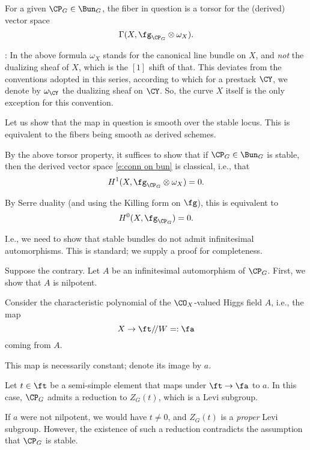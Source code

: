 \documentclass[9pt]{amsart}
\theoremstyle{remark}
\theoremstyle{definition}
\theoremstyle{remark}
\numberwithin{equation}{section}
\begin{document}
\medskip

For a given $\CP_G\in \Bun_G$, the fiber in question is a torsor for the (derived) vector space
\begin{equation} \label{e:conn on bun}
\Gamma(X,\fg_{\CP_G}\otimes \omega_X).
\end{equation} 

: In the above formula $\omega_X$ stands for the canonical line bundle on $X$, and \emph{not} 
the dualizing sheaf of $X$, which is the $[1]$ shift of that. This deviates from the conventions adopted
in this series, according to which for a prestack $\CY$, we denote by $\omega_\CY$ the dualizing
sheaf on $\CY$. So, the curve $X$ itself is the only exception for this convention.  

\sssec{}

Let us show that the map in question is smooth over the stable locus. This is equivalent to the fibers
being smooth as derived schemes. 

\medskip

By the above torsor property, it suffices to show that if $\CP_G\in \Bun_G$ is stable, then the derived vector
space \eqref{e:conn on bun} is classical, i.e., that
$$H^1(X,\fg_{\CP_G}\otimes \omega_X)=0.$$

By Serre duality (and using the Killing form on $\fg$), this is equivalent to
$$H^0(X,\fg_{\CP_G})=0.$$

I.e., we need to show that stable bundles do not admit infinitesimal automorphisms. This is standard;
we supply a proof for completeness. 

\sssec{}

Suppose the contrary. Let $A$ be an infinitesimal automorphism of $\CP_G$. First, we show that $A$ is nilpotent.

\medskip

Consider the characteristic polynomial of the
$\CO_X$-valued Higgs field $A$, i.e., the map
$$X\to \ft/\!/W=:\fa$$
coming from $A$.

\medskip

This map is necessarily constant; denote its image by $a$. 

\medskip

Let $t\in \ft$ be a semi-simple element that maps under $\ft\to \fa$ to $a$. 
In this case, $\CP_G$ admits a reduction to $Z_G(t)$, which is a Levi subgroup. 

\medskip

If $a$ were not nilpotent, we would have $t\neq 0$, and $Z_G(t)$ is a \emph{proper}
Levi subgroup. However, the existence of such a reduction contradicts the assumption that $\CP_G$ is stable.
\end{document}
